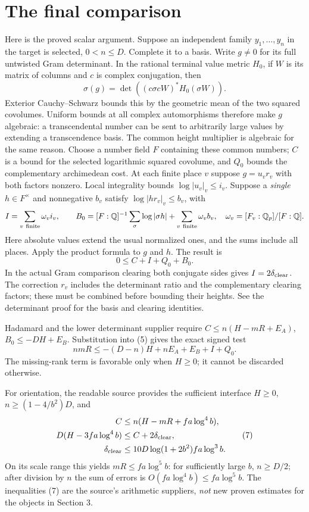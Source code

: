 \section{The final comparison}
Here is the proved scalar argument. Suppose an independent
family \(y_1,\ldots,y_n\) in the target is selected, \(0<n\le D\).
Complete it to a basis. Write \(g\ne0\) for its full untwisted
Gram determinant. In the rational terminal value metric \(H_0\),
if \(W\) is its matrix of columns and \(c\) is complex
conjugation, then
\[
 \sigma(g)=\det((c\sigma c W)^*H_0(\sigma W)).
\]
Exterior Cauchy--Schwarz bounds this by the geometric mean
of the two squared covolumes. Uniform bounds at all complex
automorphisms therefore make \(g\) algebraic: a transcendental
number can be sent to arbitrarily large values by extending a
transcendence basis. The common height multiplier is algebraic
for the same reason. Choose a number field \(F\) containing
these common numbers; \(C\) is a bound
for the selected logarithmic squared covolume, and \(Q_0\)
bounds the complementary archimedean cost. At each finite
place \(v\) suppose \(g=u_v r_v\) with both factors nonzero.
Local integrality bounds \(\log|u_v|_v\le i_v\).
Suppose a \emph{single} \(h\in F^\times\) and nonnegative
\(b_v\) satisfy \(\log|hr_v|_v\le b_v\), with
\[
 I=\sum_{v\ {\rm finite}}\omega_v i_v,\qquad
 B_0=[F:\mathbb Q]^{-1}\sum_\sigma\log|\sigma h|
       +\sum_{v\ {\rm finite}}\omega_v b_v,
 \quad \omega_v=[F_v:\mathbb Q_p]/[F:\mathbb Q].
\]
Here absolute values extend the usual normalized ones, and
the sums include all places. Apply the product formula to
\(g\) and \(h\). The result is
\[
 0\le C+I+Q_0+B_0.
 \tag{5}
\]
In the actual Gram comparison clearing both conjugate sides
gives \(I=2\delta_{\rm clear}\). The correction \(r_v\)
includes the determinant ratio and the complementary clearing
factors; these must be combined before bounding their heights.
See the 
{determinant proof} for the basis and clearing identities.

Hadamard and the lower determinant supplier require
\(C\le n(H-mR+E_A)\), \(B_0\le-DH+E_B\).
Substitution into (5) gives the exact signed test
\[
 nmR\le -(D-n)H+nE_A+E_B+I+Q_0.
 \tag{6}
\]
The missing-rank term is favorable only when \(H\ge0\);
it cannot be discarded otherwise.

For orientation, the readable source provides the sufficient
interface \(H\ge0\), \(n\ge(1-4/b^2)D\), and
\[
 \begin{split}
 C&\le n(H-mR+fa\log^4 b),\\
 D(H-3fa\log^4 b)&\le C+2\delta_{\rm clear},\\
 \delta_{\rm clear}&\le 10D\log(1+2b^2)fa\log^3 b.
 \end{split}
 \tag{7}
\]
On its scale range this yields \(mR\le fa\log^5 b\):
for sufficiently large \(b\), \(n\ge D/2\);
after division by \(n\) the sum of errors is
\(O(fa\log^4 b)\le fa\log^5 b\).
The inequalities (7) are the source's arithmetic suppliers,
\emph{not} new proven estimates for the objects in Section 3.

